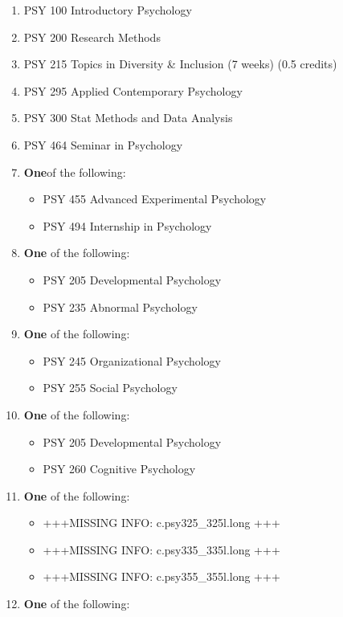 \documentclass[
  letterpaper,
]{scrbook}
\providecommand{\tightlist}{%
  \setlength{\itemsep}{0pt}\setlength{\parskip}{0pt}}
\begin{document}
\begin{enumerate}
\def\labelenumi{\arabic{enumi}.}
\item
  PSY 100 Introductory Psychology
\item
  PSY 200 Research Methods
\item
  PSY 215 Topics in Diversity \& Inclusion (7 weeks) (0.5 credits)
\item
  PSY 295 Applied Contemporary Psychology
\item
  PSY 300 Stat Methods and Data Analysis
\item
  PSY 464 Seminar in Psychology
\item
  \textbf{One}of the following:

  \begin{itemize}
  \tightlist
  \item
    PSY 455 Advanced Experimental Psychology
  \item
    PSY 494 Internship in Psychology
  \end{itemize}
\item
  \textbf{One} of the following:

  \begin{itemize}
  \tightlist
  \item
    PSY 205 Developmental Psychology
  \item
    PSY 235 Abnormal Psychology
  \end{itemize}
\item
  \textbf{One} of the following:

  \begin{itemize}
  \tightlist
  \item
    PSY 245 Organizational Psychology
  \item
    PSY 255 Social Psychology
  \end{itemize}
\item
  \textbf{One} of the following:

  \begin{itemize}
  \tightlist
  \item
    PSY 205 Developmental Psychology
  \item
    PSY 260 Cognitive Psychology
  \end{itemize}
\item
  \textbf{One} of the following:

  \begin{itemize}
  \tightlist
  \item
    +++MISSING INFO: c.psy325\_325l.long +++
  \item
    +++MISSING INFO: c.psy335\_335l.long +++
  \item
    +++MISSING INFO: c.psy355\_355l.long +++
  \end{itemize}
\item
  \textbf{One} of the following:


\end{enumerate}
\end{document}
